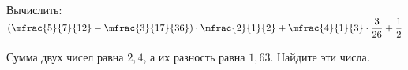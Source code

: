 \begin{class}[number=5]
\begin{listofex}[resume]
		\item Вычислить: \( \left( \mfrac{5}{7}{12}-\mfrac{3}{17}{36} \right)\cdot\mfrac{2}{1}{2}+\mfrac{4}{1}{3}\cdot\dfrac{3}{26}+\dfrac{1}{2} \)
		\item Сумма двух чисел равна \(2,4\), а их разность равна \(1,63\). Найдите эти числа.
	\end{listofex}
\end{class}
%
%
%
%	
%
%
